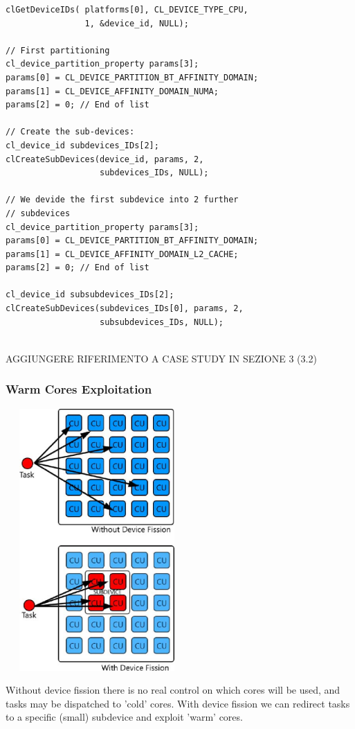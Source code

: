 {\footnotesize\begin{verbatim}
clGetDeviceIDs( platforms[0], CL_DEVICE_TYPE_CPU,
                1, &device_id, NULL);

// First partitioning
cl_device_partition_property params[3];
params[0] = CL_DEVICE_PARTITION_BT_AFFINITY_DOMAIN;
params[1] = CL_DEVICE_AFFINITY_DOMAIN_NUMA; 
params[2] = 0; // End of list

// Create the sub-devices:
cl_device_id subdevices_IDs[2];
clCreateSubDevices(device_id, params, 2,
                   subdevices_IDs, NULL);
									
// We devide the first subdevice into 2 further
// subdevices
cl_device_partition_property params[3];
params[0] = CL_DEVICE_PARTITION_BT_AFFINITY_DOMAIN;
params[1] = CL_DEVICE_AFFINITY_DOMAIN_L2_CACHE; 
params[2] = 0; // End of list

cl_device_id subsubdevices_IDs[2];
clCreateSubDevices(subdevices_IDs[0], params, 2,
                   subsubdevices_IDs, NULL);


\end{verbatim}}
\vfill
\columnbreak

AGGIUNGERE RIFERIMENTO A CASE STUDY IN SEZIONE 3 (3.2)

\subsubsection{Warm Cores Exploitation}

\begin{figurehere}
 \centering
 \includegraphics[width=7cm, height=10cm]{./eps/WarmCores.eps}
 \caption{Without device fission there is no real control on which cores will be used, and tasks may be dispatched to 'cold' cores. With device fission we can redirect tasks to a specific (small) subdevice and exploit 'warm' cores.}
 \label{fig:WarmCores}
\end{figurehere}

